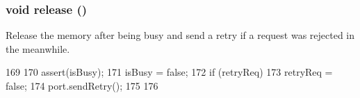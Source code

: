 \hypertarget{classSimpleMemory_a23b477d0e2d399f75d585d154c346591}{
\subsubsection[{release}]{\setlength{\rightskip}{0pt plus 5cm}void release ()}}
\label{classSimpleMemory_a23b477d0e2d399f75d585d154c346591}
Release the memory after being busy and send a retry if a request was rejected in the meanwhile. 


\begin{DoxyCode}
169 {
170     assert(isBusy);
171     isBusy = false;
172     if (retryReq) {
173         retryReq = false;
174         port.sendRetry();
175     }
176 }
\end{DoxyCode}


